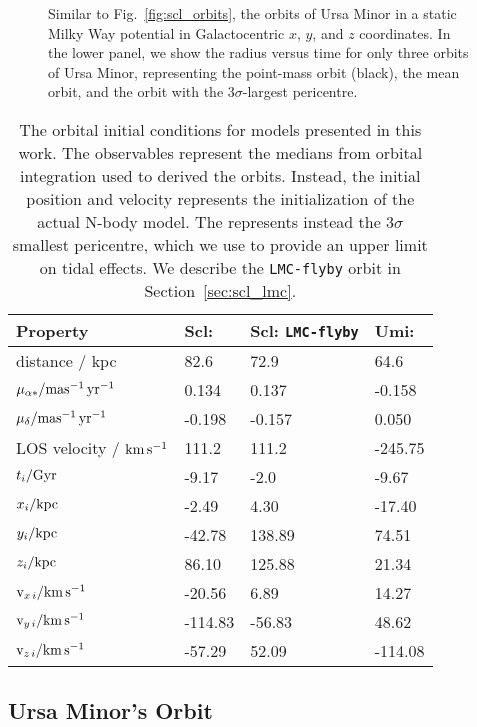 \begin{figure}
\centering
{}
\caption[Ursa Minor's possible orbits]{Similar to
Fig.~\ref{fig:scl_orbits}, the orbits of Ursa Minor in a static Milky
Way potential in Galactocentric \(x\), \(y\), and \(z\) coordinates. In
the lower panel, we show the radius versus time for only three orbits of
Ursa Minor, representing the \smallperi{} point-mass orbit (black), the
mean orbit, and the orbit with the \(3\sigma\)-largest
pericentre.}\label{fig:umi_orbits}
\end{figure}

\begin{table*}[t]
\centering
\caption[Orbit initial conditions]{The orbital initial conditions for models presented in this work. The observables represent the medians from orbital integration used to derived the orbits. Instead, the initial position and velocity represents the initialization of the actual N-body model. The \smallperi{} represents instead the $3\sigma$ smallest pericentre, which we use to provide an upper limit on tidal effects. We describe the \texttt{LMC-flyby} orbit in Section \ref{sec:scl_lmc}. }
\label{tbl:orbit_ics}
\begin{tabular}{llll}
\toprule
Property & Scl: \smallperi{} & Scl: \verb|LMC-flyby| & Umi: \smallperi{}\\
\midrule
distance / kpc & 82.6 & 72.9 & 64.6\\
$\mu_{\alpha*} / {\rm mas^{-1}\,yr^{-1}}$ & 0.134 & 0.137 & -0.158\\
$\mu_{\delta} / {\rm mas^{-1}\,yr^{-1}}$ & -0.198 & -0.157 & 0.050\\
LOS velocity / ${\rm km\,s^{-1}}$ & 111.2 & 111.2 & -245.75\\
$t_i / {\rm Gyr}$ & -9.17 & -2.0 & -9.67\\
${x}_{i} / {\rm kpc}$ & -2.49 & 4.30 & -17.40\\
${y}_{i} / {\rm kpc}$ & -42.78 & 138.89 & 74.51\\
${z}_{i} / {\rm kpc}$ & 86.10 & 125.88 & 21.34\\
${\rm v}_{x\,i} / {\rm km\,s^{-1}}$ & -20.56 & 6.89 & 14.27\\
${\rm v}_{y\,i} / {\rm km\,s^{-1}}$ & -114.83 & -56.83 & 48.62\\
${\rm v}_{z\,i} / {\rm km\,s^{-1}}$ & -57.29 & 52.09 & -114.08\\
\bottomrule
\end{tabular}
\end{table*}

\subsection{Ursa Minor's Orbit}\label{sec:orbit_corrections}

